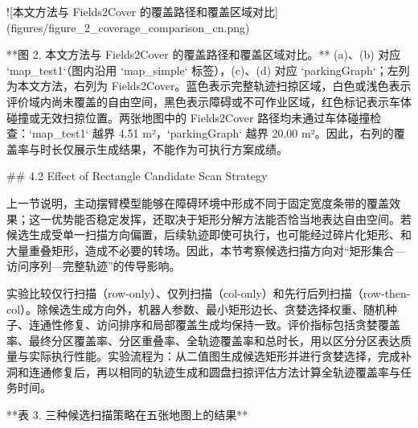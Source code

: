   
![本文方法与 Fields2Cover 的覆盖路径和覆盖区域对比](figures/figure_2_coverage_comparison_cn.png)

**图 2. 本文方法与 Fields2Cover 的覆盖路径和覆盖区域对比。** (a)、(b) 对应 `map_test1`（图内沿用 `map_simple` 标签），(c)、(d) 对应 `parkingGraph`；左列为本文方法，右列为 Fields2Cover。蓝色表示完整轨迹扫掠区域，白色或浅色表示评价域内尚未覆盖的自由空间，黑色表示障碍或不可作业区域，红色标记表示车体碰撞或无效扫掠位置。两张地图中的 Fields2Cover 路径均未通过车体碰撞检查：`map_test1` 越界 4.51 m²，`parkingGraph` 越界 20.00 m²。因此，右列的覆盖率与时长仅展示生成结果，不能作为可执行方案成绩。

  

## 4.2 Effect of Rectangle Candidate Scan Strategy

  

上一节说明，主动摆臂模型能够在障碍环境中形成不同于固定宽度条带的覆盖效果；这一优势能否稳定发挥，还取决于矩形分解方法能否恰当地表达自由空间。若候选生成受单一扫描方向偏置，后续轨迹即使可执行，也可能经过碎片化矩形、和大量重叠矩形，造成不必要的转场。因此，本节考察候选扫描方向对“矩形集合—访问序列—完整轨迹”的传导影响。

实验比较仅行扫描（row-only）、仅列扫描（col-only）和先行后列扫描（row-then-col）。除候选生成方向外，机器人参数、最小矩形边长、贪婪选择权重、随机种子、连通性修复、访问排序和局部覆盖生成均保持一致。评价指标包括贪婪覆盖率、最终分区覆盖率、分区重叠率、全轨迹覆盖率和总时长，用以区分分区表达质量与实际执行性能。实验流程为：从二值图生成候选矩形并进行贪婪选择，完成补洞和连通修复后，再以相同的轨迹生成和圆盘扫掠评估方法计算全轨迹覆盖率与任务时间。

  

**表 3. 三种候选扫描策略在五张地图上的结果**

  

